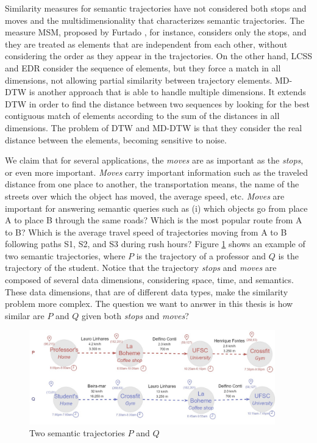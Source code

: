 \documentclass[12pt]{article}
\begin{document}
Similarity measures for semantic trajectories have not considered both stops and moves and the multidimensionality that characterizes semantic trajectories. The measure MSM, proposed by Furtado \cite{Furtado:TGIS12156}, for instance, considers only the stops, and they are treated as elements that are independent from each other, without considering the order as they appear in the trajectories. On the other hand, LCSS\cite{vlachos2002discovering} and EDR\cite{Chen:2005:RFS:1066157.1066213} consider the sequence of elements, but they force a match in all dimensions, not allowing partial similarity between trajectory elements. MD-DTW \cite{ten2007multi} is another approach that is able to handle multiple dimensions. It extends DTW \cite{berndt1994using} in order to find the distance between two sequences by looking for the best contiguous match of elements according to the sum of the distances in all dimensions. The problem of DTW and MD-DTW is that they consider the real distance between the elements, becoming sensitive to noise.

We claim that for several applications, the \emph{moves} are as important as the \emph{stops}, or even more important. \emph{Moves} carry important information such as the traveled distance from one place to another, the transportation means, the name of the streets over which the object has moved, the average speed, etc. \emph{Moves} are important for answering semantic queries such as (i) which objects go from place A to place B through the same roads? Which is the most popular route from A to B? Which is the average travel speed of trajectories moving from A to B following paths S1, S2, and S3 during rush hours? Figure \ref{fig:related_semantic_trajectories} shows an example of two semantic trajectories, where $P$ is the trajectory of a professor and $Q$ is the trajectory of the student. Notice that the trajectory \emph{stops} and \emph{moves} are composed of several data dimensions, considering space, time, and semantics. These data dimensions, that are of different data types, make the similarity problem more complex. The question we want to answer in this thesis is how similar are $P$ and $Q$ given both \emph{stops} and \emph{moves}?

\begin{figure}[!h]
\centering
\includegraphics[width=0.95\textwidth]{Related_Works/Semantic_trajectories.jpg}
\caption{\label{fig:related_semantic_trajectories}Two semantic trajectories $P$ and $Q$}
\end{figure}
\end{document}
